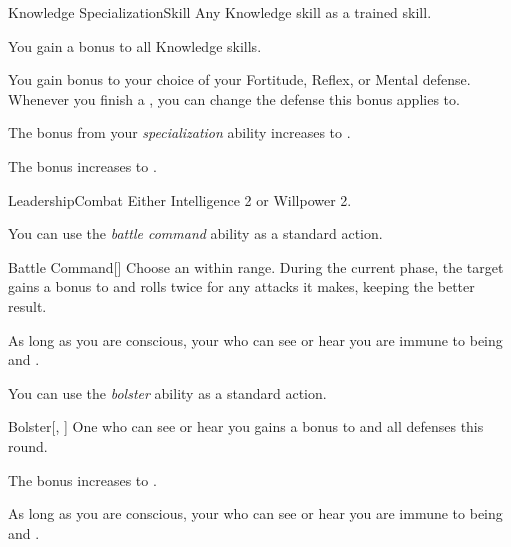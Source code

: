     \begin{feat}{Knowledge Specialization}{Skill}
        \featpre Any Knowledge skill as a trained skill.

         You gain a  bonus to all Knowledge skills.

         You gain  bonus to your choice of your Fortitude, Reflex, or Mental defense.
        Whenever you finish a , you can change the defense this bonus applies to.

         The bonus from your \textit{specialization} ability increases to .

         The bonus increases to .
    \end{feat}

    \begin{feat}{Leadership}{Combat}
        \featpre Either Intelligence 2 or Willpower 2.

         You can use the \textit{battle command} ability as a standard action.
        \begin{activeability}{Battle Command}[]
            \rankline
            Choose an  within \rngmed range.
            During the current phase, the target gains a  bonus to  and rolls twice for any attacks it makes, keeping the better result.
        \end{activeability}

         As long as you are conscious, your  who can see or hear you are immune to being \frightened and \panicked.

         You can use the \textit{bolster} ability as a standard action.
        \begin{activeability}{Bolster}[, ]
            \rankline
            One  who can see or hear you gains a  bonus to  and all defenses this round.

            \rankline
             The bonus increases to .
        \end{activeability}

         As long as you are conscious, your  who can see or hear you are immune to being \stunned and \confused.
    \end{feat}

